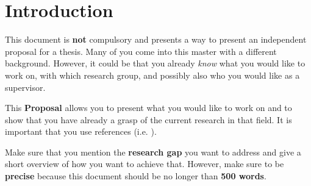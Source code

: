 \section{Introduction}
\label{sec:introduction}
This document is \textbf{not} compulsory and presents a way to present an independent proposal for a thesis. Many of you come into this master with a different background. However, it could be that you already \textit{know} what you would like to work on, with which research group, and possibly also who you would like as a supervisor.

This \textbf{Proposal} allows you to present what you would like to work on and to show that you have already a grasp of the current research in that field. It is important that you use references (i.e. \cite{Gruber1995}).

Make sure that you mention the \textbf{research gap} you want to address and give a short overview of how you want to achieve that. However, make sure to be \textbf{precise} because this document should be no longer than \textbf{500 words}.